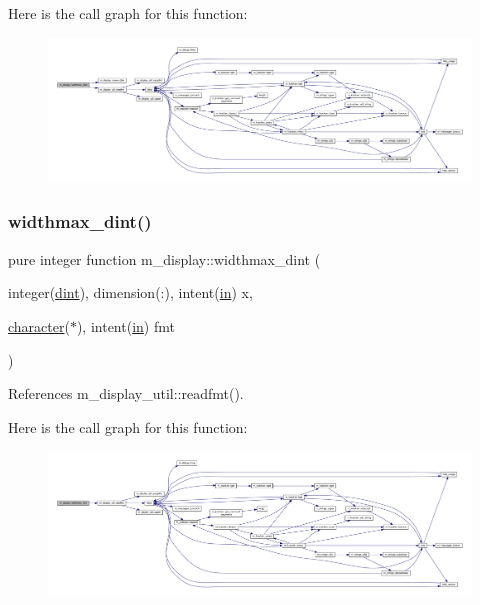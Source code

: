 Here is the call graph for this function\+:
\nopagebreak
\begin{figure}[H]
\begin{center}
\leavevmode
\includegraphics[width=350pt]{namespacem__display_aed07125464a462f9fa53ed2333846273_cgraph}
\end{center}
\end{figure}
\mbox{\label{namespacem__display_a8310ed88204e0715b21b2afb0a6d12ac}} 
\subsubsection{\texorpdfstring{widthmax\+\_\+dint()}{widthmax\_dint()}}
{\footnotesize\ttfamily pure integer function m\+\_\+display\+::widthmax\+\_\+dint (\begin{DoxyParamCaption}\item[{integer(\hyperlink{namespacem__display_a73f772e9702cad6f40b78364fde2c7cd}{dint}), dimension(\+:), intent(\hyperlink{M__journal_83_8txt_afce72651d1eed785a2132bee863b2f38}{in})}]{x,  }\item[{\hyperlink{option__stopwatch_83_8txt_abd4b21fbbd175834027b5224bfe97e66}{character}($\ast$), intent(\hyperlink{M__journal_83_8txt_afce72651d1eed785a2132bee863b2f38}{in})}]{fmt }\end{DoxyParamCaption})\hspace{0.3cm}{\ttfamily [private]}}



References m\+\_\+display\+\_\+util\+::readfmt().

Here is the call graph for this function\+:
\nopagebreak
\begin{figure}[H]
\begin{center}
\leavevmode
\includegraphics[width=350pt]{namespacem__display_a8310ed88204e0715b21b2afb0a6d12ac_cgraph}
\end{center}
\end{figure}
\mbox{\label{namespacem__display_ac342ada170e8066fa938cf8eb69f09bb}} 
